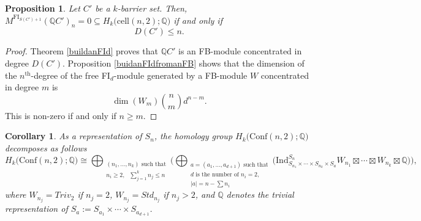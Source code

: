 \documentclass[12py]{amsart}%
\newtheorem{prop}[thm]{Proposition}
\newtheorem{cor}[thm]{Corollary}
\theoremstyle{definition}\newtheorem{definition}[thm]{Definition}
\theoremstyle{definition}
\newcommand{\Q}{\ensuremath{\mathbb{Q}}}
\begin{document}
\begin{prop}\label{whatsincluded}
Let $C'$ be a $k$-barrier set. Then, $M^{\text{FI}_{S(C')+1}}(\Q C')_{n}=0\subseteq H_{k}\big(\text{cell}(n,2);\Q\big)$ if and only if 
\[
D(C')\le n.
\]
\end{prop}

\begin{proof}
Theorem \ref{buildanFId} proves that $\Q C'$ is an FB-module concentrated in degree $D(C')$. Proposition \ref{buidanFIdfromanFB} shows that the dimension of the $n^{\text{th}}$-degree of the free FI$_{d}$-module generated by a FB-module $W$ concentrated in degree $m$ is
\[
\dim(W_{m})\binom{n}{m}d^{n-m}.
\]
This is non-zero if and only if $n\ge m$.
\end{proof}


\begin{cor}\label{decompositionasSp}
As a representation of $S_{n}$, the homology group $H_{k}\big(\text{Conf}(n,2);\Q\big)$ decomposes as follows
\[
H_{k}\big(\text{Conf}(n,2);\Q\big)\cong\bigoplus_{\substack{(n_{1},\dots, n_{k})\text{ such that}\\n_{i}\ge 2,\text{ }\sum_{j=1}^{k}n_{j}\le n}}\Big(\bigoplus_{\substack{a=(a_{1},\dots, a_{d+1})\text{ such that}\\d\text{ is the number of }n_{i}=2,\\|a|= n-\sum n_{i}}}\big(\text{Ind}^{S_{n}}_{S_{n_{1}}\times\cdots\times S_{n_{k}}\times S_{a}}W_{n_{1}}\boxtimes\cdots\boxtimes W_{n_{k}}\boxtimes \Q\big)\Big),
\]
where $W_{n_{j}}=Triv_{2}$ if $n_{j}=2$, $W_{n_{j}}=Std_{n_{j}}$ if $n_{j}>2$, and $\Q$ denotes the trivial representation of $S_{a}:=S_{a_{1}}\times\cdots \times S_{a_{d+1}}$.
\end{cor}
\end{document}
